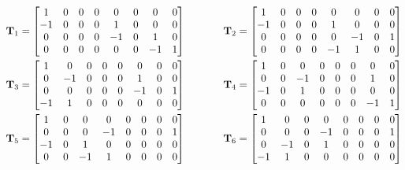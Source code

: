 \begin{equation}
\begin{aligned} \label{eq:tetrahedral-matrices}
    \mathbf{T}_1 = \begin{bmatrix}
    1 & 0 & 0 & 0 & 0 & 0 & 0 & 0 \\
    -1 & 0 & 0 & 0 & 1 & 0 & 0 & 0 \\
    0 & 0 & 0 & 0 & -1 & 0 & 1 & 0 \\
    0 & 0 & 0 & 0 & 0 & 0 & -1 & 1
    \end{bmatrix} \hspace{0.5in}
    \mathbf{T}_2 = \begin{bmatrix}
    1 & 0 & 0 & 0 & 0 & 0 & 0 & 0 \\
    -1 & 0 & 0 & 0 & 1 & 0 & 0 & 0 \\
    0 & 0 & 0 & 0 & 0 & -1 & 0 & 1 \\
    0 & 0 & 0 & 0 & -1 & 1 & 0 & 0
    \end{bmatrix} \\
    \mathbf{T}_3 = \begin{bmatrix}
    1 & 0 & 0 & 0 & 0 & 0 & 0 & 0 \\
    0 & -1 & 0 & 0 & 0 & 1 & 0 & 0 \\
    0 & 0 & 0 & 0 & 0 & -1 & 0 & 1 \\
    -1 & 1 & 0 & 0 & 0 & 0 & 0 & 0
    \end{bmatrix} \hspace{0.5in}
    \mathbf{T}_4 = \begin{bmatrix}
    1 & 0 & 0 & 0 & 0 & 0 & 0 & 0 \\
    0 & 0 & -1 & 0 & 0 & 0 & 1 & 0 \\
    -1 & 0 & 1 & 0 & 0 & 0 & 0 & 0 \\
    0 & 0 & 0 & 0 & 0 & 0 & -1 & 1
    \end{bmatrix} \\
    \mathbf{T}_5 = \begin{bmatrix}
    1 & 0 & 0 & 0 & 0 & 0 & 0 & 0 \\
    0 & 0 & 0 & -1 & 0 & 0 & 0 & 1 \\
    -1 & 0 & 1 & 0 & 0 & 0 & 0 & 0 \\
    0 & 0 & -1 & 1 & 0 & 0 & 0 & 0
    \end{bmatrix} \hspace{0.5in}
    \mathbf{T}_6 = \begin{bmatrix}
    1 & 0 & 0 & 0 & 0 & 0 & 0 & 0 \\
    0 & 0 & 0 & -1 & 0 & 0 & 0 & 1 \\
    0 & -1 & 0 & 1 & 0 & 0 & 0 & 0 \\
    -1 & 1 & 0 & 0 & 0 & 0 & 0 & 0
    \end{bmatrix}
\end{aligned}
\end{equation}

